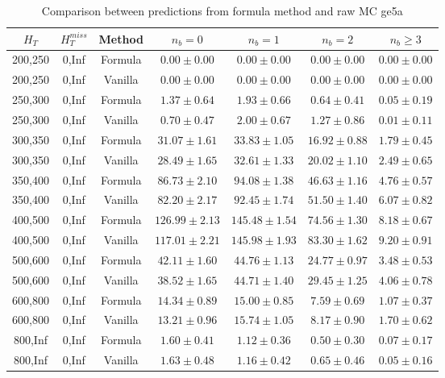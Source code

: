 \begin{longtable}{ | c | c | c | c | c | c | c | }
\caption{Comparison between predictions from formula method and raw MC ge5a} \label{tab:ge5a} \\    \hline 
$H_{T}$ & $H_{T}^{miss}$ & Method & $n_{b} = 0$ & $n_{b} = 1$ & $n_{b} = 2$ & $n_{b} \ge 3$ \\ \hline200,250 & 0,Inf & Formula  & $     0.00 \pm  0.00 $ & $     0.00 \pm  0.00 $ & $     0.00 \pm  0.00 $ & $     0.00 \pm  0.00 $  \\  
200,250 & 0,Inf & Vanilla  & $     0.00 \pm  0.00 $ & $     0.00 \pm  0.00 $ & $     0.00 \pm  0.00 $ & $     0.00 \pm  0.00 $  \\ \hline 
250,300 & 0,Inf & Formula  & $     1.37 \pm  0.64 $ & $     1.93 \pm  0.66 $ & $     0.64 \pm  0.41 $ & $     0.05 \pm  0.19 $  \\  
250,300 & 0,Inf & Vanilla  & $     0.70 \pm  0.47 $ & $     2.00 \pm  0.67 $ & $     1.27 \pm  0.86 $ & $     0.01 \pm  0.11 $  \\ \hline 
300,350 & 0,Inf & Formula  & $    31.07 \pm  1.61 $ & $    33.83 \pm  1.05 $ & $    16.92 \pm  0.88 $ & $     1.79 \pm  0.45 $  \\  
300,350 & 0,Inf & Vanilla  & $    28.49 \pm  1.65 $ & $    32.61 \pm  1.33 $ & $    20.02 \pm  1.10 $ & $     2.49 \pm  0.65 $  \\ \hline 
350,400 & 0,Inf & Formula  & $    86.73 \pm  2.10 $ & $    94.08 \pm  1.38 $ & $    46.63 \pm  1.16 $ & $     4.76 \pm  0.57 $  \\  
350,400 & 0,Inf & Vanilla  & $    82.20 \pm  2.17 $ & $    92.45 \pm  1.74 $ & $    51.50 \pm  1.40 $ & $     6.07 \pm  0.82 $  \\ \hline 
400,500 & 0,Inf & Formula  & $   126.99 \pm  2.13 $ & $   145.48 \pm  1.54 $ & $    74.56 \pm  1.30 $ & $     8.18 \pm  0.67 $  \\  
400,500 & 0,Inf & Vanilla  & $   117.01 \pm  2.21 $ & $   145.98 \pm  1.93 $ & $    83.30 \pm  1.62 $ & $     9.20 \pm  0.91 $  \\ \hline 
500,600 & 0,Inf & Formula  & $    42.11 \pm  1.60 $ & $    44.76 \pm  1.13 $ & $    24.77 \pm  0.97 $ & $     3.48 \pm  0.53 $  \\  
500,600 & 0,Inf & Vanilla  & $    38.52 \pm  1.65 $ & $    44.71 \pm  1.40 $ & $    29.45 \pm  1.25 $ & $     4.06 \pm  0.78 $  \\ \hline 
600,800 & 0,Inf & Formula  & $    14.34 \pm  0.89 $ & $    15.00 \pm  0.85 $ & $     7.59 \pm  0.69 $ & $     1.07 \pm  0.37 $  \\  
600,800 & 0,Inf & Vanilla  & $    13.21 \pm  0.96 $ & $    15.74 \pm  1.05 $ & $     8.17 \pm  0.90 $ & $     1.70 \pm  0.62 $  \\ \hline 
800,Inf & 0,Inf & Formula  & $     1.60 \pm  0.41 $ & $     1.12 \pm  0.36 $ & $     0.50 \pm  0.30 $ & $     0.07 \pm  0.17 $  \\  
800,Inf & 0,Inf & Vanilla  & $     1.63 \pm  0.48 $ & $     1.16 \pm  0.42 $ & $     0.65 \pm  0.46 $ & $     0.05 \pm  0.16 $  \\ \hline 
    \hline 
    \hline 
\end{longtable}
